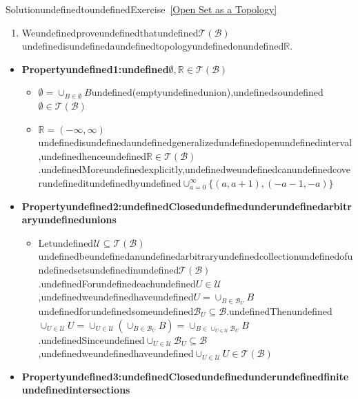 \begin{mystsolution}{SolutionundefinedtoundefinedExercise~\ref{Open Set as a Topology}}\begin{enumerate}
\item Weundefinedproveundefinedthatundefined$\mathcal{T}(\mathcal{B})$undefinedisundefinedaundefinedtopologyundefinedonundefined$\mathbb{R}$.
\end{enumerate}

\begin{itemize}
\item \textbf{Propertyundefined1:undefined$\emptyset, \mathbb{R} \in \mathcal{T}(\mathcal{B})$}

\begin{itemize}
\item $\emptyset = \cup_{B \in \emptyset} B$undefined(emptyundefinedunion),undefinedsoundefined$\emptyset \in \mathcal{T}(\mathcal{B})$
\item $\mathbb{R} = ( -\infty, \infty)$undefinedisundefinedaundefinedgeneralizedundefinedopenundefinedinterval,undefinedhenceundefined$\mathbb{R} \in \mathcal{T}(\mathcal{B})$.undefinedMoreundefinedexplicitly,undefinedweundefinedcanundefinedcoverundefineditundefinedbyundefined$\cup_{a=0}^{\infty} \{(a,a+1),( -a -1, -a)\}$
\end{itemize}


\item \textbf{Propertyundefined2:undefinedClosedundefinedunderundefinedarbitraryundefinedunions}

\begin{itemize}
\item Letundefined$\mathcal{U} \subseteq \mathcal{T}(\mathcal{B})$undefinedbeundefinedanundefinedarbitraryundefinedcollectionundefinedofundefinedsetsundefinedinundefined$\mathcal{T}(\mathcal{B})$.undefinedForundefinedeachundefined$U \in \mathcal{U}$,undefinedweundefinedhaveundefined$U = \cup_{B \in \mathcal{B}_U} B$undefinedforundefinedsomeundefined$\mathcal{B}_U \subseteq \mathcal{B}$.undefinedThenundefined$\cup_{U \in \mathcal{U}} U = \cup_{U \in \mathcal{U}} \left(\cup_{B \in \mathcal{B}_U} B\right) = \cup_{B \in \cup_{U \in \mathcal{U}} \mathcal{B}_U} B$.undefinedSinceundefined$\cup_{U \in \mathcal{U}} \mathcal{B}_U \subseteq \mathcal{B}$,undefinedweundefinedhaveundefined$\cup_{U \in \mathcal{U}} U \in \mathcal{T}(\mathcal{B})$
\end{itemize}


\item \textbf{Propertyundefined3:undefinedClosedundefinedunderundefinedfiniteundefinedintersections}


\end{itemize}
\end{mystsolution}

